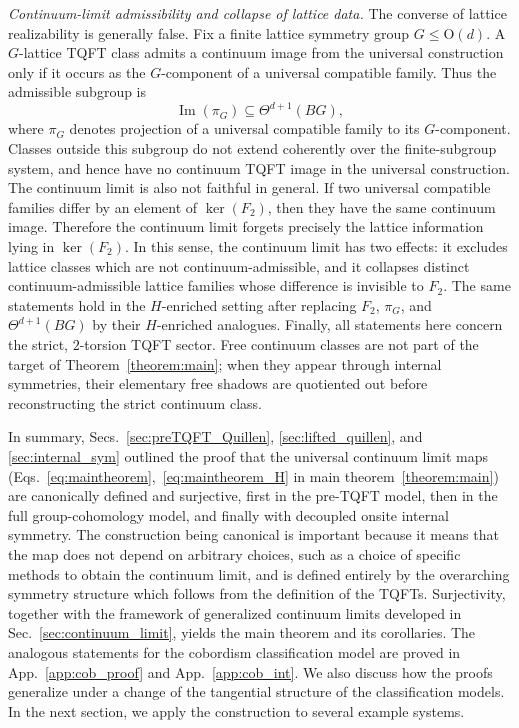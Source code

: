 \documentclass[aps,prx,reprint,superscriptaddress,twocolumn,amsmath,amssymb,amsfonts, nofootinbib]{revtex4-2}
\theoremstyle{apsstyle}
\begin{document}
\medskip 

\noindent\emph{Continuum-limit admissibility and collapse of lattice data.} The converse of lattice realizability is generally false. Fix a finite lattice symmetry group $G\leq \mathrm{O}(d)$. A $G$-lattice TQFT class admits a continuum image from the universal construction only if it occurs as the $G$-component of a universal compatible family. Thus the admissible subgroup is \[ \operatorname{Im}(\pi_G) \subseteq \Theta^{d+1}(BG), \] where $\pi_G$ denotes projection of a universal compatible family to its $G$-component. Classes outside this subgroup do not extend coherently over the finite-subgroup system, and hence have no continuum TQFT image in the universal construction. The continuum limit is also not faithful in general. If two universal compatible families differ by an element of $\ker(F_2)$, then they have the same continuum image. Therefore the continuum limit forgets precisely the lattice information lying in $\ker(F_2)$. In this sense, the continuum limit has two effects: it excludes lattice classes which are not continuum-admissible, and it collapses distinct continuum-admissible lattice families whose difference is invisible to $F_2$. The same statements hold in the $H$-enriched setting after replacing $F_2$, $\pi_G$, and $\Theta^{d+1}(BG)$ by their $H$-enriched analogues. Finally, all statements here concern the strict, $2$-torsion TQFT sector. Free continuum classes are not part of the target of Theorem~\ref{theorem:main}; when they appear through internal symmetries, their elementary free shadows are quotiented out before reconstructing the strict continuum class.

In summary, Secs.~\ref{sec:preTQFT_Quillen}, \ref{sec:lifted_quillen}, and \ref{sec:internal_sym} outlined the proof that the universal continuum limit maps (Eqs.~\ref{eq:maintheorem},~\ref{eq:maintheorem_H} in main theorem~\ref{theorem:main}) are canonically defined and surjective, first in the pre-TQFT model, then in the full group-cohomology model, and finally with decoupled onsite internal symmetry. 
The construction being canonical is important because it means that the map does not depend on arbitrary choices, such as a choice of specific methods to obtain the continuum limit, and is defined entirely by the overarching symmetry structure which follows from the definition of the TQFTs. Surjectivity, together with the framework of generalized continuum limits developed in Sec.~\ref{sec:continuum_limit}, yields the main theorem and its corollaries. The analogous statements for the cobordism classification model are proved in App.~\ref{app:cob_proof} and App.~\ref{app:cob_int}. We also discuss how the proofs generalize under a change of the tangential structure of the classification models. In the next section, we apply the construction to several example systems.
\end{document}
